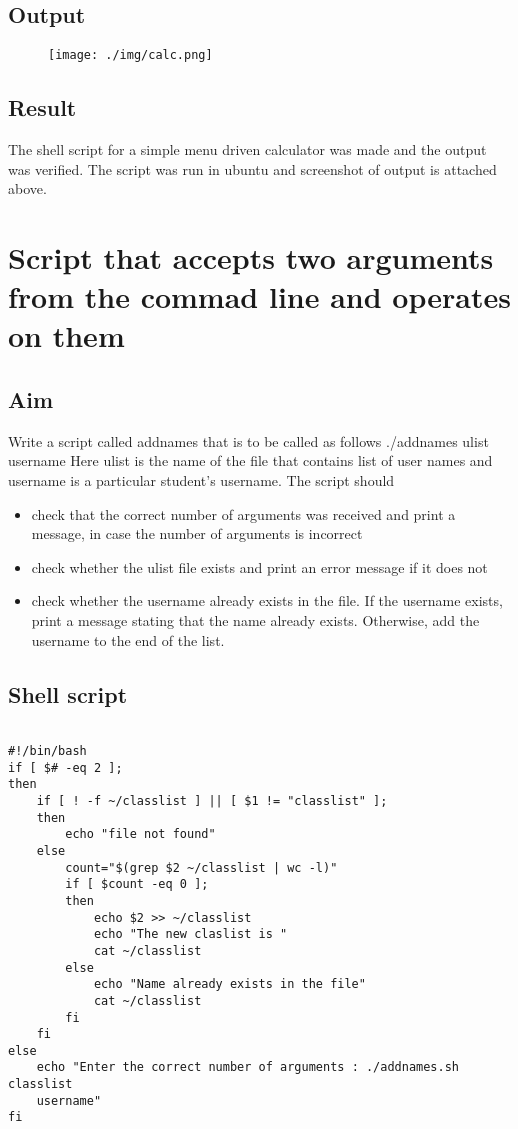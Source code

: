 \documentclass{article}
\begin{document}
\subsection{Output}
\begin{figure}[h!]
	\texttt{[image: ./img/calc.png]}
\end{figure}


\subsection{Result}
The shell script for a simple menu driven calculator was made and the output was verified. The script was run in ubuntu and screenshot of output is attached above.

\begin{refsection}
\cite{shellbible}
\cite{shellbook}
\printbibliography
\end{refsection}

\newpage

\section{Script that accepts two arguments from the commad line and operates on them}
\subsection{Aim}
Write a script called addnames that is to be called as follows ./addnames ulist username
Here ulist is the name of the file that contains list of user names and username is a particular student's username. The script should
\begin{itemize}
\item check that the correct number of arguments was received and print a message, in case the number of arguments is incorrect
\item check whether the ulist file exists and print an error message if it does not
\item check whether the username already exists in the file. If the username exists, print a message stating that the name already exists. Otherwise, add the username to the end of
the list.
\end{itemize}

\subsection{Shell script}
\begin{verbatim}

#!/bin/bash
if [ $# -eq 2 ];
then
    if [ ! -f ~/classlist ] || [ $1 != "classlist" ];
    then 
        echo "file not found"
    else
        count="$(grep $2 ~/classlist | wc -l)"
        if [ $count -eq 0 ];
        then 
            echo $2 >> ~/classlist
            echo "The new claslist is "
            cat ~/classlist
        else
            echo "Name already exists in the file"
            cat ~/classlist
        fi
    fi
else
    echo "Enter the correct number of arguments : ./addnames.sh classlist
    username"
fi

\end{verbatim}
\vfill
\end{document}
